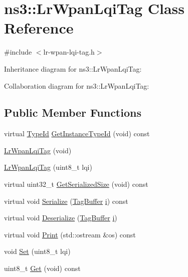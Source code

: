 \hypertarget{classns3_1_1LrWpanLqiTag}{}\section{ns3\+:\+:Lr\+Wpan\+Lqi\+Tag Class Reference}
\label{classns3_1_1LrWpanLqiTag}


{\ttfamily \#include $<$lr-\/wpan-\/lqi-\/tag.\+h$>$}



Inheritance diagram for ns3\+:\+:Lr\+Wpan\+Lqi\+Tag\+:


Collaboration diagram for ns3\+:\+:Lr\+Wpan\+Lqi\+Tag\+:
\subsection*{Public Member Functions}
\begin{DoxyCompactItemize}
\item 
virtual \hyperlink{classns3_1_1TypeId}{Type\+Id} \hyperlink{classns3_1_1LrWpanLqiTag_afd711a3e004ca248ec8ce952c808d865}{Get\+Instance\+Type\+Id} (void) const 
\item 
\hyperlink{classns3_1_1LrWpanLqiTag_a087a3cdb983567b02c9b1d76f1829608}{Lr\+Wpan\+Lqi\+Tag} (void)
\item 
\hyperlink{classns3_1_1LrWpanLqiTag_a679a6c7d400ee4d0a978612493c321ec}{Lr\+Wpan\+Lqi\+Tag} (uint8\+\_\+t lqi)
\item 
virtual uint32\+\_\+t \hyperlink{classns3_1_1LrWpanLqiTag_adff38ba3f7a40b488b91bbdf73d3e96b}{Get\+Serialized\+Size} (void) const 
\item 
virtual void \hyperlink{classns3_1_1LrWpanLqiTag_a8092c774492641bbbbf0b6e904255728}{Serialize} (\hyperlink{classns3_1_1TagBuffer}{Tag\+Buffer} \hyperlink{lte__uplink__power__control_8m_a6f6ccfcf58b31cb6412107d9d5281426}{i}) const 
\item 
virtual void \hyperlink{classns3_1_1LrWpanLqiTag_ab1d7813528fabf71cb85877177a7f082}{Deserialize} (\hyperlink{classns3_1_1TagBuffer}{Tag\+Buffer} \hyperlink{lte__uplink__power__control_8m_a6f6ccfcf58b31cb6412107d9d5281426}{i})
\item 
virtual void \hyperlink{classns3_1_1LrWpanLqiTag_a282d893704f7a5278e6cc3603d9e5bf1}{Print} (std\+::ostream \&os) const 
\item 
void \hyperlink{classns3_1_1LrWpanLqiTag_a273f6ba90b0d1361ace5de4a2b234628}{Set} (uint8\+\_\+t lqi)
\item 
uint8\+\_\+t \hyperlink{classns3_1_1LrWpanLqiTag_aead0860ee4ff4372a2241481410d24f7}{Get} (void) const 
\end{DoxyCompactItemize}
